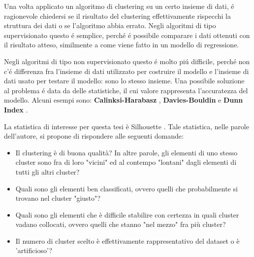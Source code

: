 \documentclass[12pt]{report}
\begin{document}
		Una volta applicato un algoritmo di clustering su un certo insieme
		di dati, é ragionevole chiedersi se il risultato del clustering
		effettivamente rispecchi la struttura dei dati o se l'algoritmo
		abbia errato. Negli algoritmi di tipo supervisionato questo é
		semplice, perché é possibile comparare i dati ottenuti con il
		risultato atteso, similmente a come viene fatto in un modello di
		regressione.

		Negli algoritmi di tipo non supervisionato questo é molto
		piú difficile, perché non c'é differenza fra l'insieme di
		dati utilizzato per costruire il modello e l'insieme di
		dati usato per testare il modello: sono lo stesso insieme.
		Una possibile soluzione al problema é data da delle statistiche,
		il cui valore rappresenta l'accuratezza del modello. Alcuni
		esempi sono: \textbf{Calinksi-Harabasz} \cite{Calinski01011974},
		\textbf{Davies-Bouldin} \cite{4766909} e \textbf{Dunn Index}
		\cite{Dunn01011974}.

		La statistica di interesse per questa tesi è Silhouette
		\cite{ROUSSEEUW198753}. Tale statistica, nelle parole
		dell'autore, si propone di rispondere alle seguenti domande:

		\begin{itemize}
			\item
			Il clustering è di buona qualità? In altre parole, gli elementi di
			uno stesso cluster sono fra di loro "vicini" ed al contempo "lontani"
			dagli elementi di tutti gli altri cluster?
			\item
			Quali sono gli elementi ben classificati, ovvero quelli che probabilmente
			si trovano nel cluster "giusto"?
			\item
			Quali sono gli elementi che è difficile stabilire con certezza in quali
			cluster vadano collocati, ovvero quelli che stanno "nel mezzo" fra più
			cluster?
			\item
			Il numero di cluster scelto è effettivamente rappresentativo del dataset
			o è 'artificioso'?
		\end{itemize}
\end{document}
